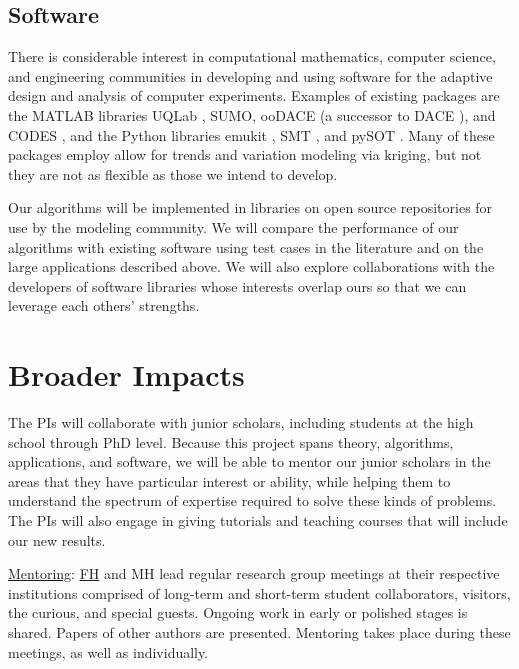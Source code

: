 \documentclass[11pt]{NSFamsart}
\newcommand{\Upara}[1]{\noindent\underline{\upshape #1}:}
\newcommand{\FH}{\hyperlink{FHlink}{FH}\xspace}
\begin{document}
\subsection{Software} \label{sec:Software}
There is considerable interest in computational mathematics, computer science, and engineering communities in developing and using software for the adaptive design and analysis of computer experiments. Examples of existing packages are the MATLAB libraries UQLab \cite{UQLab2014}, SUMO\cite{SUMO2010}, ooDACE \cite{ooDACE2014} (a successor to DACE \cite{dace2002}), and CODES \cite{CODES2015}, and the Python libraries emukit \cite{emukit2019}, SMT \cite{SMT2019}, and pySOT \cite{pySOT2015}. Many of these packages employ allow for trends and variation modeling via kriging, but not they are not as flexible as those we intend to develop.

Our algorithms will be implemented in libraries on open source repositories for use by the modeling community. We will compare the performance of our algorithms with existing software using test cases in the literature and on the large applications described above. We will also explore collaborations with the developers of software libraries whose interests overlap ours so that we can leverage each others' strengths.


\section{Broader Impacts} \label{sec:BroaderImpacts}

The PIs will collaborate with junior scholars, including students at the high school through PhD level. Because this project spans theory, algorithms, applications, and software, we will be able to mentor our junior scholars in the areas that they have particular interest or ability, while helping them to understand the spectrum of expertise required to solve these kinds of problems. The PIs will also engage in giving tutorials and teaching courses that will include our new results.

\Upara{Mentoring}
\FH and MH lead regular research group meetings at their respective institutions comprised of long-term and short-term student collaborators, visitors, the curious, and special guests. Ongoing work in early or polished stages is shared. Papers of other authors are presented. Mentoring takes place during these meetings, as well as individually.
\end{document}
